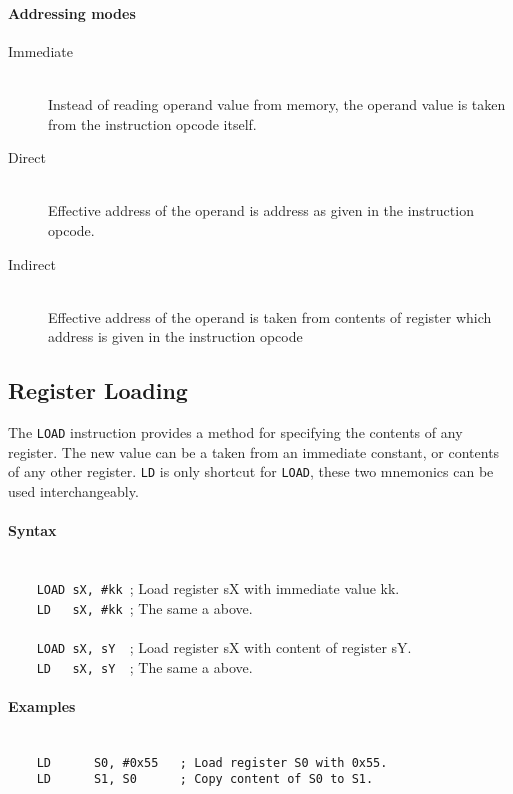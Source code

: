\paragraph{Addressing modes}
    \begin{description}
        \item[Immediate]~\\
            Instead of reading operand value from memory, the operand value is taken from the instruction opcode itself.
        \item[Direct]~\\
            Effective address of the operand is address as given in the instruction opcode.
        \item[Indirect]~\\
            Effective address of the operand is taken from contents of register which address is given in the instruction opcode
    \end{description}

\clearpage
\subsection{Register Loading}
        The \texttt{LOAD} instruction provides a method for specifying the contents of any register. The new value can be a taken from an immediate constant, or contents of any other register. \texttt{LD} is only shortcut for \texttt{LOAD}, these two mnemonics can be used interchangeably.

        \paragraph{Syntax}
            ~\\
            \verb'    LOAD sX, #kk '; Load register sX with immediate value kk.\\
            \verb'    LD   sX, #kk '; The same a above.\\
            \verb''\\
            \verb'    LOAD sX, sY  '; Load register sX with content of register sY.\\
            \verb'    LD   sX, sY  '; The same a above.

        \paragraph{Examples}
            ~\\
            \verb'    LD      S0, #0x55   ; Load register S0 with 0x55.'\\
            \verb'    LD      S1, S0      ; Copy content of S0 to S1.'

